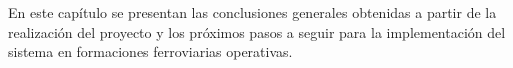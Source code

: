 En este capítulo se presentan las conclusiones generales obtenidas a partir de la realización del proyecto y los próximos pasos a seguir para la implementación del sistema en formaciones ferroviarias operativas. 

